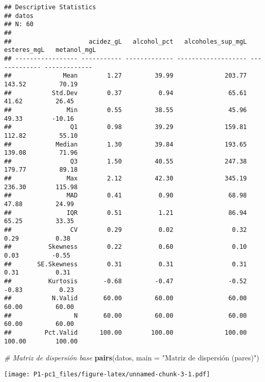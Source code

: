\documentclass[
]{article}
\newenvironment{Shaded}{\begin{snugshade}}{\end{snugshade}}
\newcommand{\AttributeTok}[1]{\textcolor[rgb]{0.13,0.29,0.53}{#1}}
\newcommand{\CommentTok}[1]{\textcolor[rgb]{0.56,0.35,0.01}{\textit{#1}}}
\newcommand{\FunctionTok}[1]{\textcolor[rgb]{0.13,0.29,0.53}{\textbf{#1}}}
\newcommand{\NormalTok}[1]{#1}
\newcommand{\StringTok}[1]{\textcolor[rgb]{0.31,0.60,0.02}{#1}}
\begin{document}
\begin{verbatim}
## Descriptive Statistics  
## datos  
## N: 60  
## 
##                     acidez_gL   alcohol_pct   alcoholes_sup_mgL   esteres_mgL   metanol_mgL
## ----------------- ----------- ------------- ------------------- ------------- -------------
##              Mean        1.27         39.99              203.77        143.52         70.19
##           Std.Dev        0.37          0.94               65.61         41.62         26.45
##               Min        0.55         38.55               45.96         49.33        -10.16
##                Q1        0.98         39.29              159.81        112.82         55.10
##            Median        1.30         39.84              193.65        139.08         71.96
##                Q3        1.50         40.55              247.38        179.77         89.18
##               Max        2.12         42.30              345.19        236.30        115.98
##               MAD        0.41          0.90               68.98         47.88         24.99
##               IQR        0.51          1.21               86.94         65.25         33.35
##                CV        0.29          0.02                0.32          0.29          0.38
##          Skewness        0.22          0.60                0.10          0.03         -0.55
##       SE.Skewness        0.31          0.31                0.31          0.31          0.31
##          Kurtosis       -0.68         -0.47               -0.52         -0.83          0.23
##           N.Valid       60.00         60.00               60.00         60.00         60.00
##                 N       60.00         60.00               60.00         60.00         60.00
##         Pct.Valid      100.00        100.00              100.00        100.00        100.00
\end{verbatim}

\begin{Shaded}
\begin{Highlighting}[]
\CommentTok{\# Matriz de dispersión base}
\FunctionTok{pairs}\NormalTok{(datos, }\AttributeTok{main =} \StringTok{"Matriz de dispersión (pares)"}\NormalTok{)}
\end{Highlighting}
\end{Shaded}

\texttt{[image: P1-pc1\_files/figure-latex/unnamed-chunk-3-1.pdf]}
\end{document}
